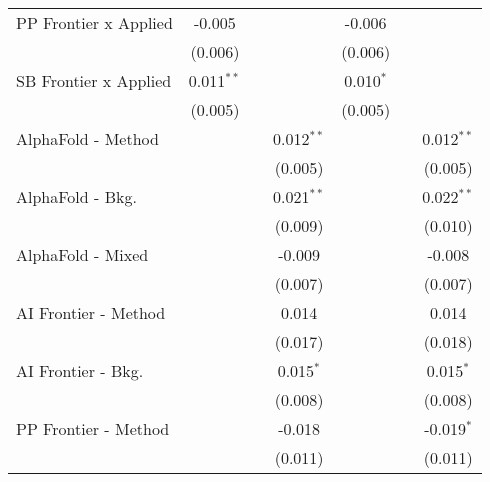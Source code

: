 \begin{tabular}{lcccccc}
   PP Frontier x Applied        & -0.005         &              &              & -0.006         &              &   \\   
                                & (0.006)        &              &              & (0.006)        &              &   \\   
   SB Frontier x Applied        & 0.011$^{**}$   &              &              & 0.010$^{*}$    &              &   \\   
                                & (0.005)        &              &              & (0.005)        &              &   \\   
   AlphaFold - Method           &                &              & 0.012$^{**}$ &                &              & 0.012$^{**}$\\   
                                &                &              & (0.005)      &                &              & (0.005)\\   
   AlphaFold - Bkg.             &                &              & 0.021$^{**}$ &                &              & 0.022$^{**}$\\   
                                &                &              & (0.009)      &                &              & (0.010)\\   
   AlphaFold - Mixed            &                &              & -0.009       &                &              & -0.008\\   
                                &                &              & (0.007)      &                &              & (0.007)\\   
   AI Frontier - Method         &                &              & 0.014        &                &              & 0.014\\   
                                &                &              & (0.017)      &                &              & (0.018)\\   
   AI Frontier - Bkg.           &                &              & 0.015$^{*}$  &                &              & 0.015$^{*}$\\   
                                &                &              & (0.008)      &                &              & (0.008)\\   
   PP Frontier - Method         &                &              & -0.018       &                &              & -0.019$^{*}$\\   
                                &                &              & (0.011)      &                &              & (0.011)\\   

\end{tabular}
